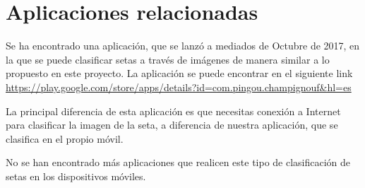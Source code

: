 \section{Aplicaciones relacionadas}

Se ha encontrado una aplicación, que se lanzó a mediados de Octubre de 2017, en la que se puede clasificar setas a través de imágenes de manera similar a lo propuesto en este proyecto. La aplicación se puede encontrar en el siguiente link \url{https://play.google.com/store/apps/details?id=com.pingou.champignouf&hl=es}

La principal diferencia de esta aplicación es que necesitas conexión a Internet para clasificar la imagen de la seta, a diferencia de nuestra aplicación, que se clasifica en el propio móvil.

No se han encontrado más aplicaciones que realicen este tipo de clasificación de setas en los dispositivos móviles.